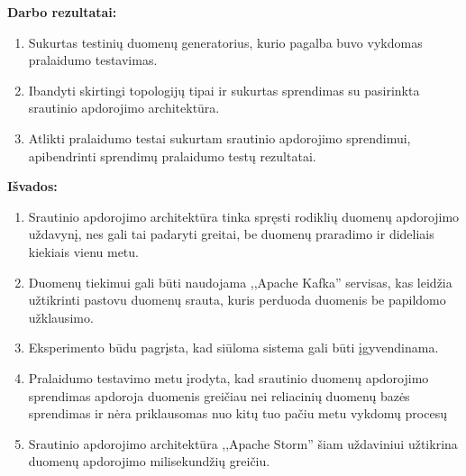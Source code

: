 \documentclass{VUMIFPSkursinis}
\begin{document}


\textbf{Darbo rezultatai:}
\vspace{1 mm}

    \begin{enumerate}
        \item Sukurtas testinių duomenų generatorius, kurio pagalba buvo vykdomas pralaidumo testavimas.
        \item Ibandyti skirtingi topologijų tipai ir sukurtas sprendimas su pasirinkta srautinio apdorojimo architektūra.
        \item Atlikti pralaidumo testai sukurtam srautinio apdorojimo sprendimui, apibendrinti sprendimų pralaidumo testų rezultatai.
    \end{enumerate}
    \vspace{1 mm}

\textbf{Išvados:}
\vspace{1 mm}

    \begin{enumerate}
    \item Srautinio apdorojimo architektūra tinka spręsti rodiklių duomenų apdorojimo uždavynį, nes gali tai padaryti greitai, be 
    duomenų praradimo ir dideliais kiekiais vienu metu.
    \item Duomenų tiekimui gali būti naudojama ,,Apache Kafka'' servisas, kas leidžia užtikrinti pastovu duomenų srauta, kuris
    perduoda duomenis be papildomo užklausimo.
    \item Eksperimento būdu pagrįsta, kad siūloma sistema gali būti įgyvendinama.
    \item Pralaidumo testavimo metu įrodyta, kad srautinio duomenų apdorojimo sprendimas apdoroja duomenis greičiau nei reliacinių duomenų
    bazės sprendimas ir nėra priklausomas nuo kitų tuo pačiu metu vykdomų procesų
    \item Srautinio apdorojimo architektūra ,,Apache Storm'' šiam uždaviniui užtikrina duomenų apdorojimo milisekundžių greičiu.  

    \end{enumerate}

\printbibliography[heading=bibintoc] 
\end{document}
